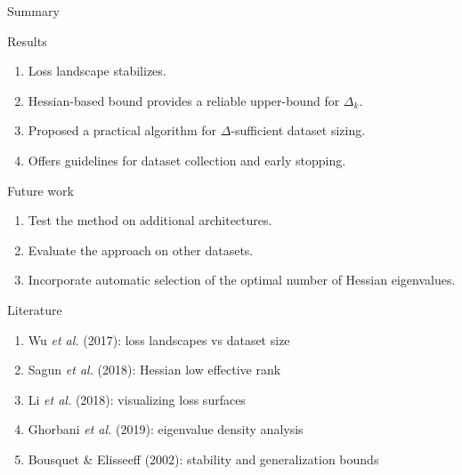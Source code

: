 \documentclass{beamer}
\begin{document}
\begin{frame}{Summary}
    \begin{block}{Results}
        \begin{enumerate}
            \item Loss landscape stabilizes.
            \item Hessian-based bound provides a reliable upper-bound for \(\Delta_k\).
            \item Proposed a practical algorithm for \(\Delta\)-sufficient dataset sizing.
            \item Offers guidelines for dataset collection and early stopping.
        \end{enumerate}
    \end{block}

    \begin{block}{Future work}
    \begin{enumerate}
        \item Test the method on additional architectures.
        \item Evaluate the approach on other datasets.
        \item Incorporate automatic selection of the optimal number of Hessian eigenvalues.
    \end{enumerate}
    \end{block}
\end{frame}

\begin{frame}{Literature}
    \begin{enumerate}
        \item Wu \textit{et al.} (2017): loss landscapes vs dataset size
        \item Sagun \textit{et al.} (2018): Hessian low effective rank
        \item Li \textit{et al.} (2018): visualizing loss surfaces
        \item Ghorbani \textit{et al.} (2019): eigenvalue density analysis
        \item Bousquet \& Elisseeff (2002): stability and generalization bounds
    \end{enumerate}
\end{frame}
\end{document}
